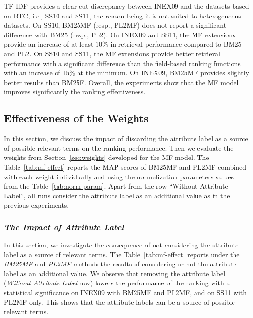 TF-IDF provides a clear-cut discrepancy between INEX09 and the datasets based on BTC, i.e., SS10 and SS11, the reason being it is not suited to heterogeneous datasets.
On SS10, BM25MF (resp., PL2MF) does not report a significant difference with BM25 (resp., PL2). On INEX09 and SS11, the MF extensions provide an increase of at least $10\%$ in retrieval performance compared to BM25 and PL2. On SS10 and SS11, the MF extensions provide better retrieval performance with a significant difference than the field-based ranking functions with an increase of $15\%$ at the minimum. On INEX09, BM25MF provides slightly better results than BM25F. Overall, the experiments show that the MF model improves significantly the ranking effectiveness.



\subsection{Effectiveness of the Weights}
\label{sec:weights-effectiveness}

In this section, we discuss the impact of discarding the attribute label as a source of possible relevant terms on the ranking performance. Then we evaluate the weights from Section~\ref{sec:weights} developed for the MF model.
The Table~\ref{tab:mf-effect} reports the MAP scores of BM25MF and PL2MF combined with each weight individually and using the normalization parameters values from the Table~\ref{tab:norm-param}. Apart from the row ``Without Attribute Label'', all runs consider the attribute label as an additional value as in the previous experiments.

\subsubsection{\emph{The Impact of Attribute Label}}
\label{sec:with-att}

In this section, we investigate the consequence of not considering the attribute label as a source of relevant terms.
The Table~\ref{tab:mf-effect} reports under the \emph{BM25MF} and \emph{PL2MF} methods the results of considering or not the attribute label as an additional value.
We observe that removing the attribute label (\emph{Without Attribute Label} row) lowers the performance of the ranking with a statistical significance on INEX09 with BM25MF and PL2MF, and on SS11 with PL2MF only. This shows that the attribute labels can be a source of possible relevant terms.

